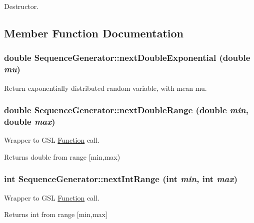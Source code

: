 Destructor. 



\subsection{Member Function Documentation}
\hypertarget{classSequenceGenerator_e5172bf7a72210a37724d3b51804e4c5}{
\subsubsection{\setlength{\rightskip}{0pt plus 5cm}double SequenceGenerator::nextDoubleExponential (double {\em mu})}}
\label{classSequenceGenerator_e5172bf7a72210a37724d3b51804e4c5}


Return exponentially distributed random variable, with mean mu. 

\hypertarget{classSequenceGenerator_15f18b2aeec1e2cab2b0c22acbc04202}{
\subsubsection{\setlength{\rightskip}{0pt plus 5cm}double SequenceGenerator::nextDoubleRange (double {\em min}, \/  double {\em max})}}
\label{classSequenceGenerator_15f18b2aeec1e2cab2b0c22acbc04202}


Wrapper to GSL \hyperlink{classFunction}{Function} call. 

Returns double from range \mbox{[}min,max) \hypertarget{classSequenceGenerator_31904303f64c5adcf91d924b41c71a80}{
\subsubsection{\setlength{\rightskip}{0pt plus 5cm}int SequenceGenerator::nextIntRange (int {\em min}, \/  int {\em max})}}
\label{classSequenceGenerator_31904303f64c5adcf91d924b41c71a80}


Wrapper to GSL \hyperlink{classFunction}{Function} call. 

Returns int from range \mbox{[}min,max\mbox{]} 

